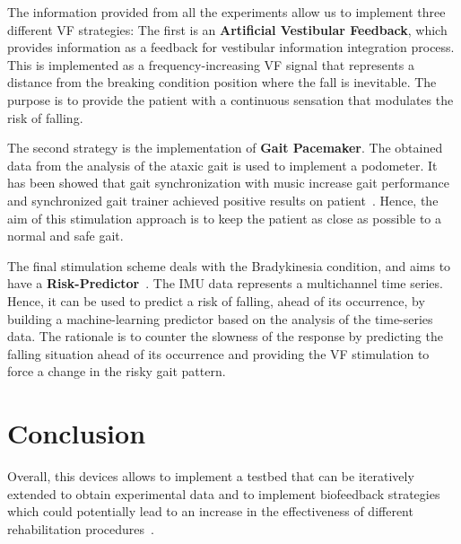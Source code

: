 \documentclass[conference]{IEEEtran}
\begin{document}
The information provided from all the experiments allow us to implement three different VF strategies:  The first is an \textbf{Artificial Vestibular Feedback}, which provides information as a feedback for vestibular information integration process.  This is implemented as a frequency-increasing VF signal that represents a distance from the breaking condition position where the fall is inevitable.   The purpose is to provide the patient with a continuous sensation that modulates the risk of falling.

The second strategy is the implementation of \textbf{Gait Pacemaker}.  The obtained data from the analysis of the ataxic gait is used to implement a podometer.  It has been showed that gait synchronization with music increase gait performance~\cite{Roerdink.etal2007} and synchronized gait trainer achieved positive results on patient~\cite{Blicher.etal2009}.  Hence, the aim of this stimulation approach is to keep the patient as close as possible to a normal and safe gait.

The final stimulation scheme deals with the Bradykinesia condition, and aims to have a \textbf{Risk-Predictor}~\cite{Rahman.etal2022,Ali.etal2022}.  The IMU data  represents a multichannel time series.  Hence, it can be used to predict a risk of falling, ahead of its occurrence, by building a machine-learning predictor based on the analysis of the time-series data.  The rationale is to counter the slowness of the response by predicting the falling situation ahead of its occurrence and providing the VF stimulation to force a change in the risky gait pattern.



\section*{Conclusion}
Overall, this devices allows to implement a testbed that can be iteratively extended to obtain experimental data and to implement biofeedback strategies which could potentially lead to an increase in the effectiveness of different rehabilitation procedures~\cite{Bowman2021}.
\end{document}
